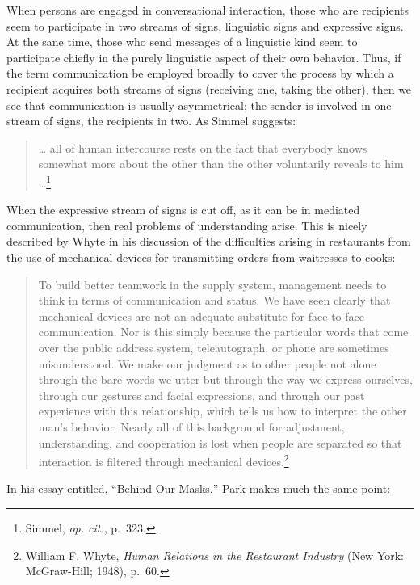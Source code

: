 \documentclass[twoside,symmetric,nobib,justified]{tufte-book}
\begin{document}
When persons are engaged in conversational interaction, those who are
recipients seem to participate in two streams of signs, linguistic signs
and expressive signs. At the sane time, those who send messages of a
linguistic kind seem to participate chiefly in the purely linguistic
aspect of their own behavior. Thus, if the term communication be
employed broadly to cover the process by which a recipient acquires both
streams of signs (re­ceiving one, taking the other), then we see that
communication is usually asymmetrical; the sender is involved in one
stream of signs, the recipients in two. As Simmel suggests:

\begin{quote}
\ldots{} all of human intercourse rests on the fact that every­body knows
somewhat more about the other than the other voluntarily reveals to him
\ldots{}\footnote{Simmel, \emph{op. cit.}, p.~323.}
\end{quote}

\noindent When the expressive stream of signs is cut off, as it can be in mediated
communication, then real problems of understanding arise. This is nicely
described by Whyte in his discussion of the difficulties arising in
restaurants from the use of mechani­cal devices for transmitting orders
from waitresses to cooks:

\begin{quote}
To build better teamwork in the supply system, management needs to think
in terms of communication and status. We have seen clearly that
mechanical devices are not an adequate substitute for face-to-face
communication. Nor is this simply because the particular words that come
over the pub­lic address system, teleautograph, or phone are sometimes
misunderstood. We make our judgment as to other people not alone through
the bare words we utter but through the way we express ourselves,
through our gestures and facial expres­sions, and through our past
experience with this relation­ship, which tells us how to interpret the
other man's be­havior. Nearly all of this background for adjustment,
understanding, and cooperation is lost when people are separated so that
interaction is filtered through mechanical devices.\footnote{William F.
  Whyte, \emph{Human Relations in the Restaurant Industry} (New York:
  McGraw-Hill; 1948), p.~60.}
\end{quote}

\noindent In his essay entitled, ``Behind Our Masks,'' Park makes much the same
point:
\end{document}
